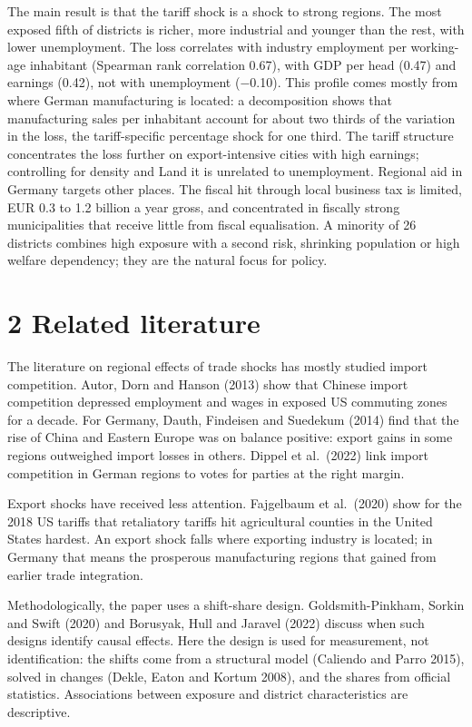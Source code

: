 \documentclass[
  11pt,
]{article}
\begin{document}
The main result is that the tariff shock is a shock to strong regions.
The most exposed fifth of districts is richer, more industrial and
younger than the rest, with lower unemployment. The loss correlates with
industry employment per working-age inhabitant (Spearman rank
correlation 0.67), with GDP per head (0.47) and earnings (0.42), not
with unemployment (−0.10). This profile comes mostly from where German
manufacturing is located: a decomposition shows that manufacturing sales
per inhabitant account for about two thirds of the variation in the
loss, the tariff-specific percentage shock for one third. The tariff
structure concentrates the loss further on export-intensive cities with
high earnings; controlling for density and Land it is unrelated to
unemployment. Regional aid in Germany targets other places. The fiscal
hit through local business tax is limited, EUR 0.3 to 1.2 billion a year
gross, and concentrated in fiscally strong municipalities that receive
little from fiscal equalisation. A minority of 26 districts combines
high exposure with a second risk, shrinking population or high welfare
dependency; they are the natural focus for policy.

\hypertarget{related-literature}{%
\section{2 Related literature}\label{related-literature}}

The literature on regional effects of trade shocks has mostly studied
import competition. Autor, Dorn and Hanson (2013) show that Chinese
import competition depressed employment and wages in exposed US
commuting zones for a decade. For Germany, Dauth, Findeisen and Suedekum
(2014) find that the rise of China and Eastern Europe was on balance
positive: export gains in some regions outweighed import losses in
others. Dippel et al.~(2022) link import competition in German regions
to votes for parties at the right margin.

Export shocks have received less attention. Fajgelbaum et al.~(2020)
show for the 2018 US tariffs that retaliatory tariffs hit agricultural
counties in the United States hardest. An export shock falls where
exporting industry is located; in Germany that means the prosperous
manufacturing regions that gained from earlier trade integration.

Methodologically, the paper uses a shift-share design.
Goldsmith-Pinkham, Sorkin and Swift (2020) and Borusyak, Hull and
Jaravel (2022) discuss when such designs identify causal effects. Here
the design is used for measurement, not identification: the shifts come
from a structural model (Caliendo and Parro 2015), solved in changes
(Dekle, Eaton and Kortum 2008), and the shares from official statistics.
Associations between exposure and district characteristics are
descriptive.
\end{document}
